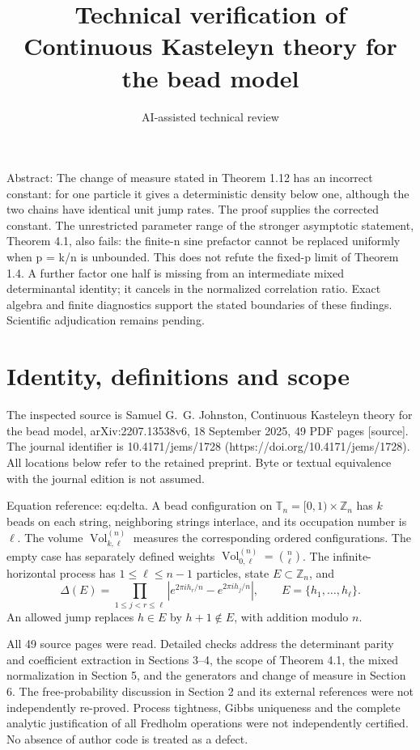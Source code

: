 \documentclass[10pt]{article}
\title{Technical verification of
Continuous Kasteleyn theory for the bead model}
\author{AI-assisted technical review}
\date{}
\begin{document}
\maketitle
Abstract: The change of measure stated in Theorem 1.12 has an incorrect constant: for one particle it gives a deterministic density below one, although the two chains have identical unit jump rates. The proof supplies the corrected constant. The unrestricted parameter range of the stronger asymptotic statement, Theorem 4.1, also fails: the finite-n sine prefactor cannot be replaced uniformly when p = k/n is unbounded. This does not refute the fixed-p limit of Theorem 1.4. A further factor one half is missing from an intermediate mixed determinantal identity; it cancels in the normalized correlation ratio. Exact algebra and finite diagnostics support the stated boundaries of these findings. Scientific adjudication remains pending.\par
\section*{Identity, definitions and scope}
The inspected source is Samuel G. G. Johnston, Continuous Kasteleyn theory for the bead model, arXiv:2207.13538v6, 18 September 2025, 49 PDF pages [source]. The journal identifier is 10.4171/jems/1728 (https://doi.org/10.4171/jems/1728). All locations below refer to the retained preprint. Byte or textual equivalence with the journal edition is not assumed.\par
Equation reference: eq:delta. A bead configuration on \(\mathbb T_n=[0,1)\times\mathbb Z_n\) has \(k\) beads on each string, neighboring strings interlace, and its occupation number is \(\ell\). The volume \(\operatorname{Vol}^{(n)}_{k,\ell}\) measures the corresponding ordered configurations. The empty case has separately defined weights \(\operatorname{Vol}^{(n)}_{0,\ell}=\binom n\ell\). The infinite-horizontal process has \(1\leq\ell\leq n-1\) particles, state \(E\subset\mathbb Z_n\), and \[
 \Delta(E)=\prod_{1\leq j<r\leq\ell}
 \left|e^{2\pi i h_r/n}-e^{2\pi i h_j/n}\right|,
 \qquad E=\{h_1,\ldots,h_\ell\}.\] An allowed jump replaces \(h\in E\) by \(h+1\notin E\), with addition modulo \(n\).\par
All 49 source pages were read. Detailed checks address the determinant parity and coefficient extraction in Sections 3–4, the scope of Theorem 4.1, the mixed normalization in Section 5, and the generators and change of measure in Section 6. The free-probability discussion in Section 2 and its external references were not independently re-proved. Process tightness, Gibbs uniqueness and the complete analytic justification of all Fredholm operations were not independently certified. No absence of author code is treated as a defect.\par
\end{document}
